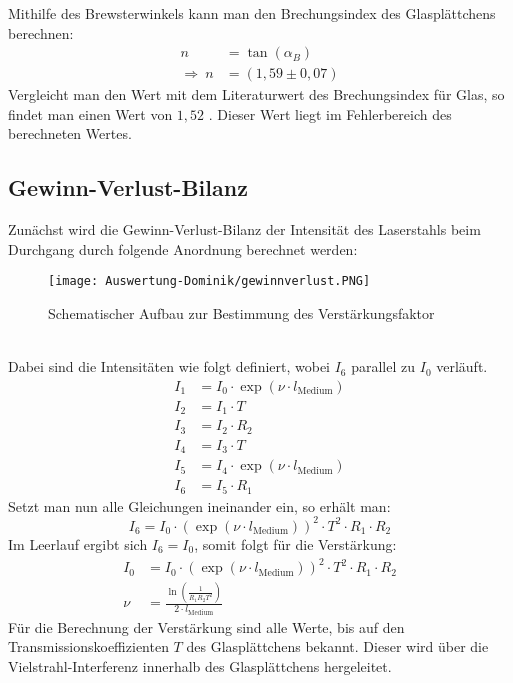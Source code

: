 Mithilfe des Brewsterwinkels kann man den Brechungsindex des Glasplättchens berechnen:
\begin{align}
    n&=\tan(\alpha_B)\\
    \Rightarrow\:n&=\left(1,59\pm0,07\right)
\end{align}
Vergleicht man den Wert mit dem Literaturwert des Brechungsindex für Glas, so findet man einen Wert von $1,52$ \citep[vgl.][]{Brechungsindes-Wiki}.
Dieser Wert liegt im Fehlerbereich des berechneten Wertes.
\subsection{Gewinn-Verlust-Bilanz}
Zunächst wird die Gewinn-Verlust-Bilanz der Intensität des Laserstahls beim Durchgang durch folgende Anordnung berechnet werden:
\begin{figure}[h]
    \centering\texttt{[image: Auswertung-Dominik/gewinnverlust.PNG]}
    \caption{Schematischer Aufbau zur Bestimmung des Verstärkungsfaktor \citep[vgl.][]{Anleitung}}
\end{figure}\\
Dabei sind die Intensitäten wie folgt definiert, wobei $I_6$ parallel zu $I_0$ verläuft.
\begin{align*}
    I_1&=I_0\cdot\exp\left(\nu\cdot l_\text{Medium}\right)\\
    I_2&=I_1\cdot T\\
    I_3&=I_2\cdot R_2\\
    I_4&=I_3\cdot T\\
    I_5&=I_4\cdot\exp\left(\nu\cdot l_\text{Medium}\right)\\
    I_6&=I_5\cdot R_1
\end{align*}
Setzt man nun alle Gleichungen ineinander ein, so erhält man:
\begin{equation}
    I_6=I_0\cdot\left(\exp\left(\nu\cdot l_\text{Medium}\right)\right)^2\cdot T^2\cdot R_1\cdot R_2
\end{equation}
Im Leerlauf ergibt sich $I_6=I_0$, somit folgt für die Verstärkung:
\begin{align}
    I_0&=I_0\cdot\left(\exp\left(\nu\cdot l_\text{Medium}\right)\right)^2\cdot T^2\cdot R_1\cdot R_2\\
    \nu&=\frac{\ln\left(\frac{1}{R_1R_2T^2}\right)}{2\cdot l_\text{Medium}}
\end{align}
Für die Berechnung der Verstärkung sind alle Werte, bis auf den Transmissionskoeffizienten $T$ des Glasplättchens bekannt.
Dieser wird über die Vielstrahl-Interferenz innerhalb des Glasplättchens hergeleitet.
